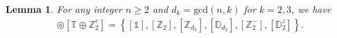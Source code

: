 \documentclass[11pt,a4paper]{amsart}
\newtheorem{lem}[thm]{Lemma}
\theoremstyle{definition}
\newcommand{\ZZ}{\mathbb{Z}}                %
\newcommand{\octa}{\mathbb{O}}              %
\newcommand{\ico}{\mathbb{I}}               %
\newcommand{\tetra}{\mathbb{T}}             %
\newcommand{\DD}{\mathbb{D}}                %
\newcommand{\1}{\mathds{1}}		            %
\newcommand{\set}[1]{\left\{#1\right\}}     %
\newcommand{\Dnd}{\DD_{2n}^d}
\begin{document}
\begin{lem}
  For any integer $n\geq 2$ and $d_k=\text{gcd}(n,k)$ for $k=2,3$, we have
  \begin{align*}
    [\Dnd]\circledcirc [\tetra\oplus\ZZ_2^c]           
               =\set{[\1],[\ZZ_2],[\ZZ_{d_3}],[\DD_{d_2}],[\ZZ_2^-],[\DD_2^z]}.                                                                    
   \end{align*}

\end{lem}
\end{document}
